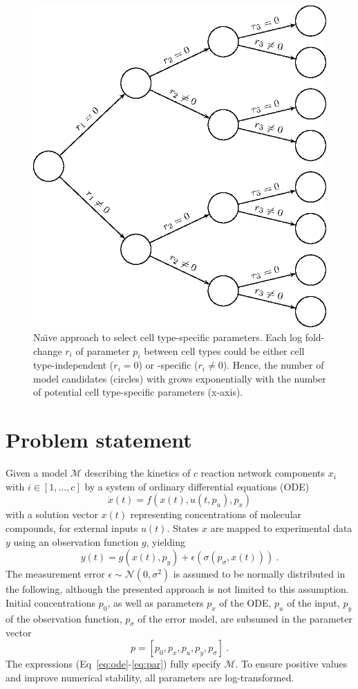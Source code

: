 \documentclass{bioinfo}
\begin{document}
\begin{figure}[!tpb]%
\centerline{\includegraphics[width=.4\textwidth]{Figures/tree.eps}}
\caption{Na\"{\i}ve approach to select cell type-specific parameters. Each log fold-change $r_i$ of parameter $p_i$ between cell types could be either cell type-independent ($r_i=0$) or -specific ($r_i\neq 0$). Hence, the number of model candidates (circles) with grows exponentially with the number of potential cell type-specific parameters (x-axis).}\label{fig:01}
\end{figure}

\section{Problem statement}

Given a model $\mathcal M$ describing the kinetics of $c$ reaction network components $x_i$ with $i \in [1,\dots,c]$ by a system of ordinary differential equations (ODE)
\begin{equation}
\dot x(t) = f(x(t),u(t,p_u),p_x)\label{eq:ode}
\end{equation}
with a solution vector $x(t)$ representing concentrations of molecular compounds, for external inputs $u(t)$.
States $x$ are mapped to experimental data $y$ using an observation function $g$, yielding
\begin{equation}
y(t) = g(x(t),p_y)+\epsilon(\sigma(p_\sigma,x(t))) \:.\label{eq:obs}
\end{equation}
The measurement error $\epsilon \sim \mathcal N(0,\sigma^2)$ is assumed to be normally distributed in the following, although the presented approach is not limited to this assumption.
Initial concentrations $p_0$, as well as parameters $p_x$ of the ODE, $p_u$ of the input, $p_y$ of the observation function, $p_\sigma$ of the error model, are subsumed in the parameter vector
\begin{equation}
p = [p_0, p_x, p_u, p_y, p_\sigma] \:.\label{eq:par}
\end{equation}
The expressions (Eq~\ref{eq:ode}-\ref{eq:par}) fully specify $\mathcal M$.
To ensure positive values and improve numerical stability, all parameters are log-transformed.
\end{document}
